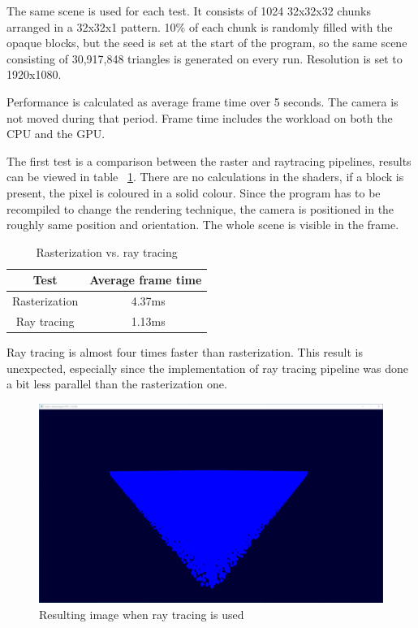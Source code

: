 \documentclass[times, utf8, zavrsni, numeric]{fer}
\begin{document}
The same scene is used for each test. It consists of 1024 32x32x32 chunks arranged in a 32x32x1 pattern. 10\% of each chunk is randomly filled with the opaque blocks, but the seed is set at the start of the program, so the same scene consisting of 30,917,848 triangles is generated on every run. Resolution is set to 1920x1080.

Performance is calculated as average frame time over 5 seconds. The camera is not moved during that period. Frame time includes the workload on both the CPU and the GPU.

The first test is a comparison between the raster and raytracing pipelines, results can be viewed in table ~\ref{table:ras_vs_ray}. There are no calculations in the shaders, if a block is present, the pixel is coloured in a solid colour. Since the program has to be recompiled to change the rendering technique, the camera is positioned in the roughly same position and orientation. The whole scene is visible in the frame.

\begin{table}[H]
\caption{Rasterization vs. ray tracing}
\begin{center}
\begin{tabular}{|c|c|}
\hline
Test & Average frame time \\
\hline
Rasterization & ~4.37ms \\
\hline
Ray tracing & ~1.13ms \\
\hline
\end{tabular}
\label{table:ras_vs_ray}
\end{center}
\end{table}

Ray tracing is almost four times faster than rasterization. This result is unexpected, especially since the implementation of ray tracing pipeline was done a bit less parallel than the rasterization one.

\begin{center}
\begin{figure}[H]
\includegraphics[width=1\textwidth]{tests/ray_trace_simple.png}
\caption{Resulting image when ray tracing is used}
\end{figure}
\end{center}
\end{document}
